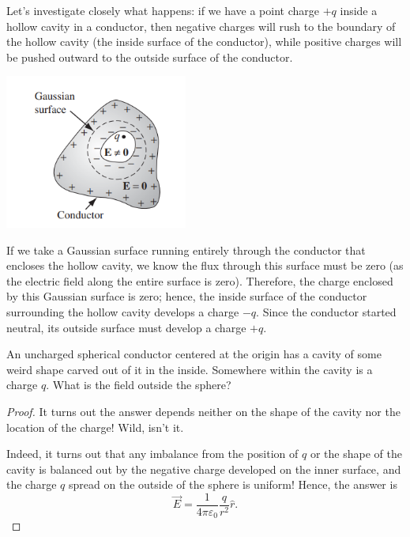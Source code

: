 Let's investigate closely what happens: if we have a point charge $+q$ inside a hollow cavity in a conductor, then negative charges will rush to the boundary of the hollow cavity (the inside surface of the conductor), while positive charges will be pushed outward to the outside surface of the conductor. 

\begin{center}
    \includegraphics[width=6cm]{Electrodynamics/images/fig2.45.PNG}
\end{center}

If we take a Gaussian surface running entirely through the conductor that encloses the hollow cavity, we know the flux through this surface must be zero (as the electric field along the entire surface is zero). Therefore, the charge enclosed by this Gaussian surface is zero; hence, the inside surface of the conductor surrounding the hollow cavity develops a charge $-q$. Since the conductor started neutral, its outside surface must develop a charge $+q$. 

\begin{example}
An uncharged spherical conductor centered at the origin has a cavity of some weird shape carved out of it in the inside. Somewhere within the cavity is a charge $q$. What is the field outside the sphere?
\end{example}

\begin{proof}
    It turns out the answer depends neither on the shape of the cavity nor the location of the charge! Wild, isn't it. 
    
    Indeed, it turns out that any imbalance from the position of $q$ or the shape of the cavity is balanced out by the negative charge developed on the inner surface, and the charge $q$ spread on the outside of the sphere is uniform! Hence, the answer is
    \[\boxed{\vec{E}=\frac{1}{4\pi\varepsilon_0}\frac{q}{r^2}\hat{r}}.\]
\end{proof}

